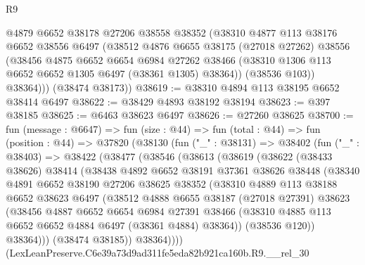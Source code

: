 \begin{lexlean}{R9}
\begin{coremodule}
          @4879
          @6652
          @38178
          @27206
          @38558
          @38352
          (@38310
            @4877
            @113
            @38176
            @6652
            @38556
            @6497
            (@38512
              @4876
              @6655
              @38175
              (@27018 @27262)
              @38556
              (@38456
                @4875
                @6652
                @6654
                @6984
                @27262
                @38466
                (@38310 @1306 @113 @6652 @6652 @1305 @6497 (@38361 @1305) @38364))
              (@38536 @103))
            @38364)))
      (@38474 @38173))
@38619 := @38310 @4894 @113 @38195 @6652 @38414 @6497
@38622 := @38429 @4893 @38192 @38194
@38623 := @397 @38185
@38625 := @6463 @38623 @6497
@38626 := @27260 @38625
@38700 := fun (message : @6647) =>
  fun (size : @44) =>
  fun (total : @44) =>
  fun (position : @44) =>
  @37820
    (@38130
      (fun ("_" : @38131) =>
      @38402
        (fun ("_" : @38403) =>
        @38422
          (@38477
            (@38546
              (@38613
                (@38619
                  (@38622
                    (@38433 @38626)
                    @38414
                    (@38438
                      @4892
                      @6652
                      @38191
                      @37361
                      @38626
                      @38448
                      (@38340
                        @4891
                        @6652
                        @38190
                        @27206
                        @38625
                        @38352
                        (@38310
                          @4889
                          @113
                          @38188
                          @6652
                          @38623
                          @6497
                          (@38512
                            @4888
                            @6655
                            @38187
                            (@27018 @27391)
                            @38623
                            (@38456
                              @4887
                              @6652
                              @6654
                              @6984
                              @27391
                              @38466
                              (@38310 @4885 @113 @6652 @6652 @4884 @6497 (@38361 @4884) @38364))
                            (@38536 @120))
                          @38364)))
                    (@38474 @38185))
                  @38364))))
          (LexLeanPreserve.C6e39a73d9ad311fe5eda82b921ca160b.R9.__rel_30

\end{coremodule}
\end{lexlean}
